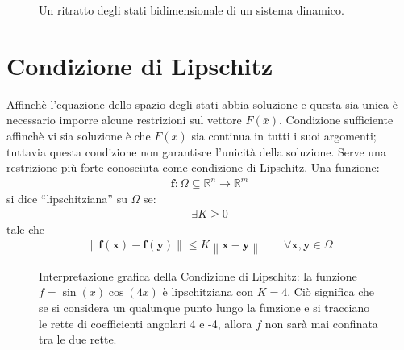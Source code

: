 \begin{figure}[h!]
	\centering
	\caption{Un ritratto degli stati bidimensionale di un sistema dinamico.}
\end{figure}

\section{Condizione di Lipschitz} %
\label{sub:condizione_di_lischitz}
Affinchè l’equazione dello spazio degli stati abbia soluzione e questa sia unica è necessario imporre alcune restrizioni sul vettore $F(\bar{x})$. Condizione sufficiente affinchè vi sia soluzione è che $F(x)$ sia continua in tutti i suoi argomenti; tuttavia questa condizione non garantisce l’unicità della soluzione. Serve una restrizione più forte conosciuta come condizione di Lipschitz. Una funzione:
\begin{align*}
    \mathbf{f}: \Omega \subseteq \mathbb{R}^n \rightarrow \mathbb{R}^m
\end{align*}
si dice “lipschitziana” su $\Omega$ se:
\begin{align*}
    \exists K \ge 0 
\end{align*}
tale che 
\begin{align*}
    \left \| \mathbf{f}(\mathbf{x}) - \mathbf{f}(\mathbf{y}) \right \| \le K \left \| \mathbf{x} - \mathbf{y} \right \| \qquad \forall \mathbf{x}, \mathbf{y} \in \Omega 
\end{align*}

\newpage

\begin{figure}[h!]
    \centering
    \caption{Interpretazione grafica della Condizione di Lipschitz: la funzione $f=\sin(x)\cos(4x)$ è lipschitziana con $K=4$. Ciò significa che se si considera un qualunque punto lungo la funzione e si tracciano le rette di coefficienti angolari 4 e -4, allora $f$ non sarà mai confinata tra le due rette.}
\end{figure}

